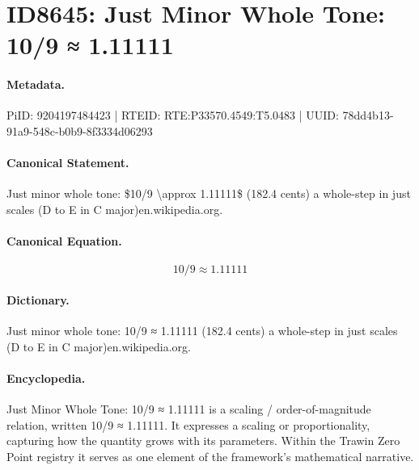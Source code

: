 \section*{ID8645: Just Minor Whole Tone: 10/9 ≈ 1.11111}
\paragraph{Metadata.}
PiID: 9204197484423 | RTEID: RTE:P33570.4549:T5.0483 | UUID: 78dd4b13-91a9-548c-b0b9-8f3334d06293

\paragraph{Canonical Statement.}
Just minor whole tone: \$10/9 \textbackslash{}approx 1.11111\$ (182.4 cents) a whole-step in just scales (D to E in C major)en.wikipedia.org.

\paragraph{Canonical Equation.}
\[
10/9 \approx 1.11111
\]

\paragraph{Dictionary.}
Just minor whole tone: 10/9 ≈ 1.11111 (182.4 cents) a whole-step in just scales (D to E in C major)en.wikipedia.org.

\paragraph{Encyclopedia.}
Just Minor Whole Tone: 10/9 ≈ 1.11111 is a scaling / order-of-magnitude relation, written 10/9 ≈ 1.11111. It expresses a scaling or proportionality, capturing how the quantity grows with its parameters. Within the Trawin Zero Point registry it serves as one element of the framework's mathematical narrative.
